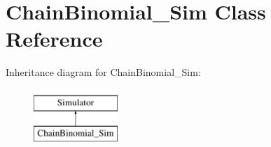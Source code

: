 \hypertarget{classChainBinomial__Sim}{}\section{Chain\+Binomial\+\_\+\+Sim Class Reference}
\label{classChainBinomial__Sim}
Inheritance diagram for Chain\+Binomial\+\_\+\+Sim\+:\begin{figure}[H]
\begin{center}
\leavevmode
\includegraphics[height=2.000000cm]{classChainBinomial__Sim}
\end{center}
\end{figure}
